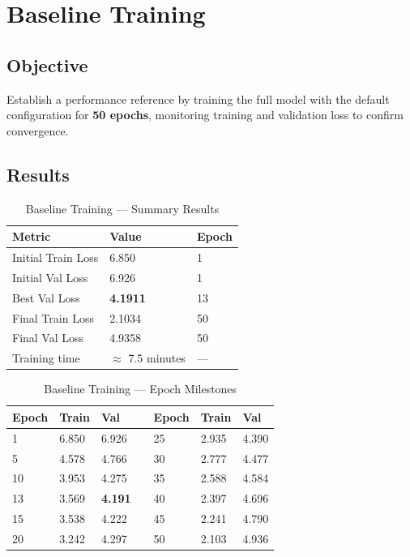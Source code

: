 \documentclass[12pt,a4paper]{article}
\begin{document}
\newpage
\section{Baseline Training}

\subsection{Objective}

Establish a performance reference by training the full model with the default configuration for \textbf{50 epochs}, monitoring training and validation loss to confirm convergence.

\subsection{Results}

\begin{table}[H]
\centering
\caption{Baseline Training — Summary Results}
\renewcommand{\arraystretch}{1.3}
\begin{tabular}{lll}
  \toprule
  \textbf{Metric} & \textbf{Value} & \textbf{Epoch} \\
  \midrule
  Initial Train Loss  & 6.850 & 1 \\
  Initial Val Loss    & 6.926 & 1 \\
  Best Val Loss       & \textbf{4.1911} & 13 \\
  Final Train Loss    & 2.1034 & 50 \\
  Final Val Loss      & 4.9358 & 50 \\
  Training time       & $\approx$ 7.5 minutes & — \\
  \bottomrule
\end{tabular}
\end{table}

\begin{table}[H]
\centering
\caption{Baseline Training — Epoch Milestones}
\small\renewcommand{\arraystretch}{1.3}
\begin{tabular}{C{1.4cm}C{2.3cm}C{2.3cm}C{0.3cm}C{1.4cm}C{2.3cm}C{2.3cm}}
  \toprule
  \textbf{Epoch} & \textbf{Train} & \textbf{Val} && \textbf{Epoch} & \textbf{Train} & \textbf{Val} \\
    & 6.850 & 6.926 && 25 & 2.935 & 4.390 \\
  5  & 4.578 & 4.766 && 30 & 2.777 & 4.477 \\
  10 & 3.953 & 4.275 && 35 & 2.588 & 4.584 \\
  13 & 3.569 & \textbf{4.191} && 40 & 2.397 & 4.696 \\
  15 & 3.538 & 4.222 && 45 & 2.241 & 4.790 \\
  20 & 3.242 & 4.297 && 50 & 2.103 & 4.936 \\
  \bottomrule
\end{tabular}
\end{table}
\end{document}
